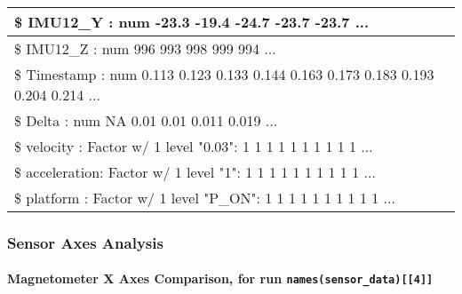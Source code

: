 \documentclass[]{article}
\let\oldparagraph\paragraph
\renewcommand{\paragraph}[1]{\oldparagraph{#1}\mbox{}}
\begin{document}
\begin{table}[!h]
\begin{tabular}[t]{l}
\hline
\$ IMU12\_Y     : num  -23.3 -19.4 -24.7 -23.7 -23.7 ...\\
\hline
\$ IMU12\_Z     : num  996 993 998 999 994 ...\\
\hline
\$ Timestamp   : num  0.113 0.123 0.133 0.144 0.163 0.173 0.183 0.193 0.204 0.214 ...\\
\hline
\$ Delta       : num  NA 0.01 0.01 0.011 0.019 ...\\
\hline
\$ velocity    : Factor w/ 1 level "0.03": 1 1 1 1 1 1 1 1 1 1 ...\\
\hline
\$ acceleration: Factor w/ 1 level "1": 1 1 1 1 1 1 1 1 1 1 ...\\
\hline
\$ platform    : Factor w/ 1 level "P\_ON": 1 1 1 1 1 1 1 1 1 1 ...\\
\hline
\end{tabular}
\end{table}

\newpage

\hypertarget{sensor-axes-analysis}{%
\subsubsection{Sensor Axes Analysis}\label{sensor-axes-analysis}}

\hypertarget{magnetometer-x-axes-comparison-for-run-namessensor_data4}{%
\paragraph{\texorpdfstring{Magnetometer X Axes Comparison, for run
\texttt{names(sensor\_data){[}{[}4{]}{]}}}{Magnetometer X Axes Comparison, for run names(sensor\_data){[}{[}4{]}{]}}}\label{magnetometer-x-axes-comparison-for-run-namessensor_data4}}
\end{document}

